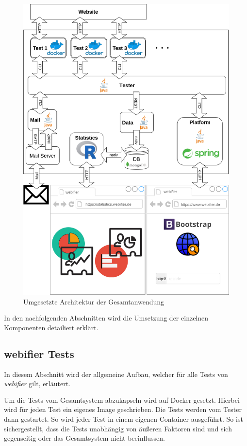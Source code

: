 \begin{figure}[H]
	\centering
	\includegraphics[width=\textwidth]{images/anwendung-umsetzung}
	\caption{Umgesetzte Architektur der Gesamtanwendung}
	\label{fig:anwendung-umsetzung}
\end{figure}

In den nachfolgenden Abschnitten wird die Umsetzung der einzelnen Komponenten detailiert erklärt.

\subsection{webifier Tests}
In diesem Abschnitt wird der allgemeine Aufbau, welcher für alle Tests von \textit{webifier} gilt,
erläutert.

Um die Tests vom Gesamtsystem abzukapseln wird auf Docker gesetzt. Hierbei wird für jeden Test ein eigenes Image geschrieben. Die Tests werden vom Tester dann gestartet. So wird jeder Test in einem eigenen Container ausgeführt. So ist sichergestellt, dass die Tests unabhängig von äußeren Faktoren sind und sich gegenseitig oder das Gesamtsystem nicht beeinflussen.

